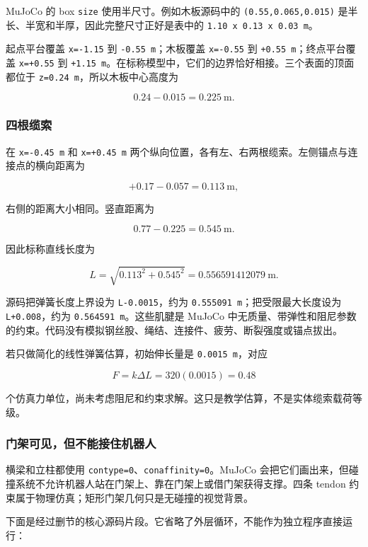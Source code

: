 \documentclass[
  chinese,
  11pt,
  letterpaper,
]{article}
\begin{document}
MuJoCo 的 box \texttt{size} 使用半尺寸。例如木板源码中的
\texttt{(0.55,0.065,0.015)} 是半长、半宽和半厚，因此完整尺寸正好是表中的
\texttt{1.10\ x\ 0.13\ x\ 0.03\ m}。

起点平台覆盖 \texttt{x=-1.15} 到 \texttt{-0.55\ m}；木板覆盖
\texttt{x=-0.55} 到 \texttt{+0.55\ m}；终点平台覆盖 \texttt{x=+0.55} 到
\texttt{+1.15\ m}。在标称模型中，它们的边界恰好相接。三个表面的顶面都位于
\texttt{z=0.24\ m}，所以木板中心高度为

\[
0.24-0.015=0.225\ \text{m}.
\]

\subsubsection{四根缆索}\label{ux56dbux6839ux7f06ux7d22}

在 \texttt{x=-0.45\ m} 和 \texttt{x=+0.45\ m}
两个纵向位置，各有左、右两根缆索。左侧锚点与连接点的横向距离为

\[
+\!0.17-0.057=0.113\ \text{m},
\]

右侧的距离大小相同。竖直距离为

\[
0.77-0.225=0.545\ \text{m}.
\]

因此标称直线长度为

\[
L=\sqrt{0.113^2+0.545^2}
  =0.556591412079\ \text{m}.
\]

源码把弹簧长度上界设为 \texttt{L-0.0015}，约为
\texttt{0.555091\ m}；把受限最大长度设为 \texttt{L+0.008}，约为
\texttt{0.564591\ m}。这些肌腱是 MuJoCo
中无质量、带弹性和阻尼参数的约束。代码没有模拟钢丝股、绳结、连接件、疲劳、断裂强度或锚点拔出。

若只做简化的线性弹簧估算，初始伸长量是 \texttt{0.0015\ m}，对应

\[
F=k\Delta L=320(0.0015)=0.48
\]

个仿真力单位，尚未考虑阻尼和约束求解。这只是教学估算，不是实体缆索载荷等级。

\subsubsection{门架可见，但不能接住机器人}\label{ux95e8ux67b6ux53efux89c1ux4f46ux4e0dux80fdux63a5ux4f4fux673aux5668ux4eba}

横梁和立柱都使用 \texttt{contype=0}、\texttt{conaffinity=0}。MuJoCo
会把它们画出来，但碰撞系统不允许机器人站在门架上、靠在门架上或借门架获得支撑。四条
tendon 约束属于物理仿真；矩形门架几何只是无碰撞的视觉背景。

下面是经过删节的核心源码片段。它省略了外层循环，不能作为独立程序直接运行：
\end{document}
